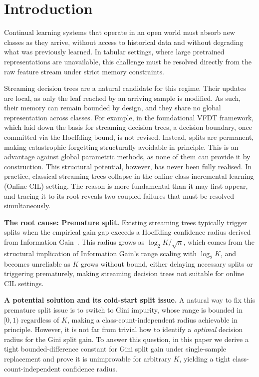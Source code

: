 \documentclass{article}
\begin{document}
\section{Introduction}
Continual learning systems that operate in an open world must absorb new
classes as they arrive, without access to historical data and without
degrading what was previously learned. In tabular settings, where large
pretrained representations are unavailable, this challenge must be resolved
directly from the raw feature stream under strict memory constraints.

Streaming decision trees are a natural candidate for this regime. Their updates 
are local, as only the leaf reached by an arriving sample is modified. As such, their memory 
can remain bounded by design, and they share no global representation across classes. 
For example, in the foundational VFDT framework, which laid down the basis for streaming decision trees, a decision 
boundary, once committed via the Hoeffding bound, is not revised. Instead, 
splits are permanent, making catastrophic forgetting structurally 
avoidable in principle. This is an advantage against global parametric methods, as none of them can 
provide it by construction. This structural potential, however, 
has never been fully realised. In practice, classical streaming trees collapse in the online 
class-incremental learning (Online CIL) setting. The reason is more fundamental than it may 
first appear, and tracing it to its root reveals two coupled failures that must be 
resolved simultaneously.

\noindent
\textbf{The root cause: Premature split.}
Existing streaming trees typically 
trigger splits when the empirical gain gap
exceeds a Hoeffding confidence radius derived from Information Gain~\cite{DomingosHulten2000,ManapragadaWebbSalehi2018,korycki2021,BifetGavalda2009HAT,chaouki2024}. This
radius grows as $\log_2 K / \sqrt{n}$, which comes from the structural implication of
Information Gain's range scaling with $\log_2 K$, and becomes unreliable
as $K$ grows without bound, either delaying necessary splits or triggering
prematurely, making streaming decision trees not suitable for online CIL settings. 

\noindent
\textbf{A potential solution and its cold-start split issue.}
A natural way to fix this premature split issue is to switch to Gini
impurity, whose range is bounded in $[0,1)$ regardless of $K$, making a
class-count-independent radius achievable in principle. However, it is not far from trivial how to identify a \emph{optimal} decision radius
for the Gini split gain.
%
To answer this question, in this paper we derive a tight bounded-difference constant for Gini split gain under
single-sample replacement and prove it is unimprovable for arbitrary $K$,
yielding a tight class-count-independent confidence radius. 
\end{document}

